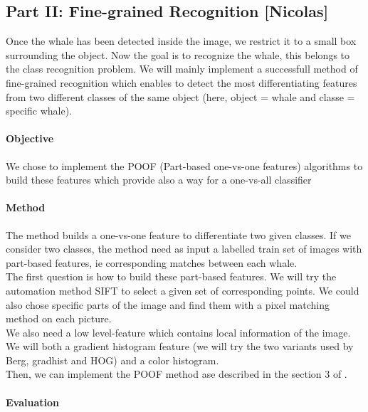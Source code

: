 \documentclass[11pt,a4paper,oneside]{report}
\begin{document}
\subsection*{Part II: Fine-grained Recognition [Nicolas]}
Once the whale has been detected inside the image, we restrict it to a small box surrounding the object. Now the goal is to recognize the whale, this belongs to the class recognition problem. We will mainly implement a successfull method of fine-grained recognition which enables to detect the most differentiating features from two different classes of the same object (here, object = whale and classe = specific whale).

\paragraph{Objective}

We chose to implement the POOF (Part-based one-vs-one features) algorithms to build these features which provide also a way for a one-vs-all classifier

\paragraph{Method}

The method builds a one-vs-one feature to differentiate two given classes.
If we consider two classes, the method need as input a labelled train set of images with part-based features, ie corresponding matches between each whale.\\

The first question is how to build these part-based features. We will try the automation method SIFT to select a given set of corresponding points. We could also chose specific parts of the image and find them with a pixel matching method on each picture.\\

We also need a low level-feature which contains local information of the image. We will both a gradient histogram feature (we will try the two variants used by Berg, gradhist and HOG) and a color histogram.\\

Then, we can implement the POOF method ase described in the section 3 of \cite{berg-poof-cvpr2013}.

\paragraph{Evaluation}
\end{document}
